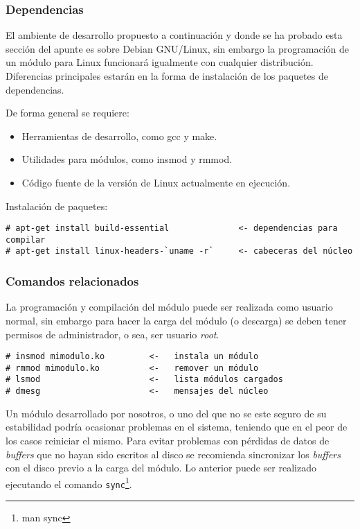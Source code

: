 \subsubsection{Dependencias}

El ambiente de desarrollo propuesto a continuación y donde se ha probado esta sección del apunte es sobre Debian GNU/Linux, sin embargo la programación de un módulo para Linux funcionará igualmente con cualquier distribución. Diferencias principales estarán en la forma de instalación de los paquetes de dependencias.

De forma general se requiere:
\begin{itemize}
	\item Herramientas de desarrollo, como gcc y make.
	\item Utilidades para módulos, como insmod y rmmod.
	\item Código fuente de la versión de Linux actualmente en ejecución.
\end{itemize}

Instalación de paquetes:
\begin{verbatim}
# apt-get install build-essential              <- dependencias para compilar
# apt-get install linux-headers-`uname -r`     <- cabeceras del núcleo
\end{verbatim}

\subsubsection{Comandos relacionados}

La programación y compilación del módulo puede ser realizada como usuario normal, sin embargo para hacer la carga del módulo (o descarga) se deben tener permisos de administrador, o sea, ser usuario \textit{root}.

\begin{verbatim}
# insmod mimodulo.ko         <-   instala un módulo
# rmmod mimodulo.ko          <-   remover un módulo
# lsmod                      <-   lista módulos cargados
# dmesg                      <-   mensajes del núcleo
\end{verbatim}

Un módulo desarrollado por nosotros, o uno del que no se este seguro de su estabilidad podría ocasionar problemas en el sistema, teniendo que en el peor de los casos reiniciar el mismo. Para evitar problemas con pérdidas de datos de \textit{buffers} que no hayan sido escritos al disco se recomienda sincronizar los \textit{buffers} con el disco previo a la carga del módulo. Lo anterior puede ser realizado ejecutando el comando \texttt{sync}\footnote{man sync}.

